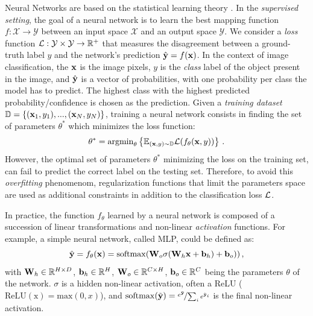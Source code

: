 Neural Networks are based on the statistical learning theory \citep{vapnik1999statstheory}. In the
\textit{supervised setting}, the goal of a neural network is to learn the best mapping function $f :
      \mathcal{X} \rightarrow \mathcal{Y}$ between an input space $\mathcal{X}$ and an output space
$\mathcal{Y}$.  We consider a \textit{loss} function $\mathcal{L} : \mathcal{Y} \times \mathcal{Y} \rightarrow
      \mathbb{R}^+$ that measures the disagreement between a ground-truth label $y$ and the network's
prediction $\hat{\mathbf{y}} = f(\mathbf{x})$. In the context of image classification, the $\mathbf{x}$ is the image
pixels, $y$ is the \textit{class} label of the object present in the image, and $\hat{\mathbf{y}}$ is a
vector of probabilities, with one probability per class the model has to predict. The highest class
with the highest predicted probability/confidence is chosen as the prediction.
Given a \textit{training dataset} $\mathbb{D} = \{(\mathbf{x}_1, y_1), ..., (\mathbf{x}_N, y_N)\}$, training a neural network
consists in finding the set of parameters $\theta^*$ which minimizes the loss function:
%
\begin{equation}
      \theta^* = \operatorname{argmin}_{\theta} \left \{ \mathbb{E}_{(\mathbf{x},y) \sim \mathbb{D}} \mathcal{L}(f_\theta(\mathbf{x}, y))\right \}\,.
      \label{eq:intro_optim}
\end{equation}
%
However, the optimal set of parameters $\theta^*$ minimizing the loss on the training set, can fail
to predict the correct label on the testing set. Therefore, to avoid this \textit{overfitting} phenomenom,
regularization functions that limit the parameters space are used as additional constraints in addition
to the classification loss $\mathcal{L}$.

In practice, the function $f_\theta$ learned by a neural network is composed of a succession of linear
transformations and non-linear \textit{activation} functions. For example, a simple neural network,
called \ac{MLP}, could be defined as:
%
\begin{equation}
      \hat{\mathbf{y}} = f_\theta(\mathbf{x}) = \operatorname{softmax}(\mathbf{W}_o \sigma(\mathbf{W}_h \mathbf{x} + \mathbf{b}_h) + \mathbf{b}_o))\,,
      \label{eq:intro_mlp}
\end{equation}
%
\noindent with $\mathbf{W}_h \in \mathbb{R}^{H \times D}$, $\mathbf{b}_h \in \mathbb{R}^{H}$, $\mathbf{W}_o \in
      \mathbb{R}^{C \times H}$, $\mathbf{b}_o \in \mathbb{R}^{C}$ being the parameters $\theta$ of the
network. $\sigma$ is a hidden non-linear activation, often a \ac{ReLU}
($\operatorname{ReLU(x)} = \text{max}(0, x)$), and $\operatorname{softmax}(\tilde{\mathbf{y}}) =
      \nicefrac{e^{\tilde{\mathbf{y}}}}{\sum_{i} e^{\tilde{\mathbf{y}}_i}}$ is the final non-linear activation.

